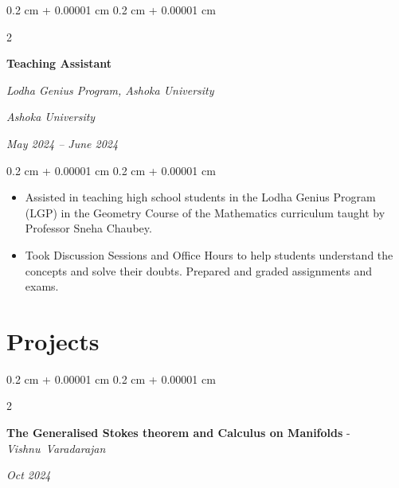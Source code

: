 \documentclass[10pt, letterpaper]{article}
\newenvironment{highlights}{
    \begin{itemize}[
        topsep=0.10 cm,
        parsep=0.10 cm,
        partopsep=0pt,
        itemsep=0pt,
        leftmargin=0.4 cm + 10pt
    ]
}{
    \end{itemize}
} %
\newenvironment{onecolentry}{
    \begin{adjustwidth}{
        0.2 cm + 0.00001 cm
    }{
        0.2 cm + 0.00001 cm
    }
}{
    \end{adjustwidth}
} %
\newenvironment{twocolentry}[2][]{
    \onecolentry
    \def\secondColumn{#2}
    \setcolumnwidth{\fill, 4.5 cm}
    \begin{paracol}{2}
}{
    \switchcolumn \raggedleft \secondColumn
    \end{paracol}
    \endonecolentry
} %
\begin{document}
        \vspace{0.2 cm}


        
        \begin{twocolentry}{
        \textit{Ashoka University}    
            
        \textit{May 2024 – June 2024}}
            \textbf{Teaching Assistant}
            
            \textit{Lodha Genius Program, Ashoka University}
        \end{twocolentry}

        \vspace{0.10 cm}
        \begin{onecolentry}
            \begin{highlights}
                \item Assisted in teaching high school students in the Lodha Genius Program (LGP) in the Geometry Course of the Mathematics curriculum taught by Professor Sneha Chaubey.
                \item Took Discussion Sessions and Office Hours to help students understand the concepts and solve their doubts. Prepared and graded assignments and exams.
            \end{highlights}
        \end{onecolentry}


        \vspace{0.2 cm}


    

    
    \section{Projects}

    \begin{twocolentry}{
        \textit{Oct 2024}
    }
        \textbf{The Generalised Stokes theorem and Calculus on Manifolds} - \mbox{{\textit{Vishnu Varadarajan}}}

        \vspace{0.10 cm}

        
    \end{twocolentry}
\end{document}
